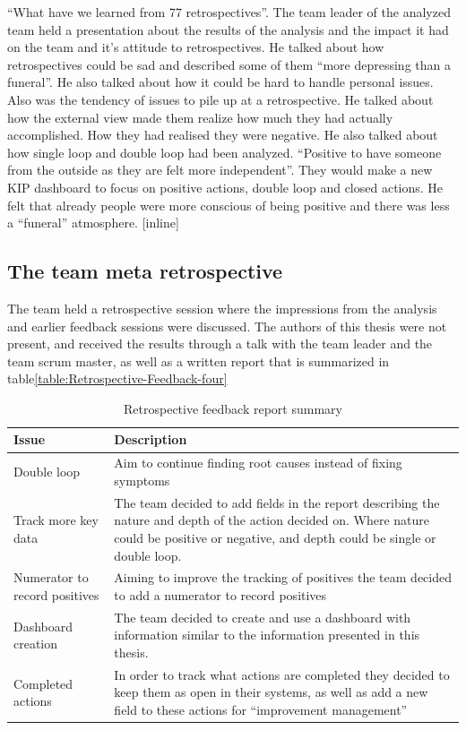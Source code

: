 ``What have we learned from 77 retrospectives''. The team leader of the analyzed team held a presentation about the results of the analysis and the impact it had on the team and it's attitude to retrospectives. He talked about how retrospectives could be sad and described some of them ``more depressing than a funeral''. He also talked about how it could be hard to handle personal issues. Also was the tendency of issues to pile up at a retrospective. He talked about how the external view made them realize how much they had actually accomplished. How they had realised they were negative. He also talked about how single loop and double loop had been analyzed. ``Positive to have someone from the outside as they are felt more independent''. They would make a new KIP dashboard to focus on positive actions, double loop and closed actions. He felt that already people were more conscious of being positive and there was less a ``funeral'' atmosphere.  
[inline]

\subsection{The team meta retrospective}
The team held a retrospective session where the impressions from the analysis and earlier feedback sessions were discussed. The authors of this thesis were not present, and received the results through a talk with the team leader and the team scrum master, as well as a written report that is summarized in table\autoref{table:Retrospective-Feedback-four}

\begin{table}[!h]
	\begin{center}
	\caption{Retrospective feedback report summary}
	\label{table:Retrospective-Feedback-four}
	\begin{tabular}{ l  p{} }
	\hline
	Issue & Description \\
	\hline
	Double loop & Aim to continue finding root causes instead of fixing symptoms \\
	Track more key data & The team decided to add fields in the report describing the nature and depth of the action decided on. Where nature could be positive or negative, and depth could be single or double loop.\\
	Numerator to record positives & Aiming to improve the tracking of positives the team decided to add a numerator to record positives \\
	Dashboard creation & The team decided to create and use a dashboard with information similar to the information presented in this thesis.  \\
	Completed actions & In order to track what actions are completed they decided to keep them as open in their systems, as well as add a new field to these actions for ``improvement management'' \\
	\hline
	\end{tabular}
	\end{center}
\end{table}



